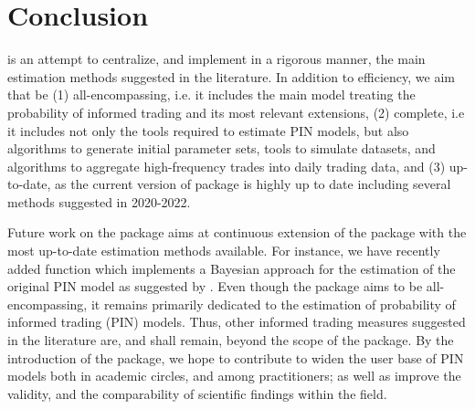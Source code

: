 \section{Conclusion}

 is an attempt to centralize, and implement in a rigorous manner, the main estimation methods suggested in the literature.  In addition to efficiency, we aim that  be (1) all-encompassing, i.e. it includes the main model treating the probability of informed trading and its most relevant extensions, (2) complete, i.e it includes not only the tools required to estimate PIN models, but also algorithms to generate initial parameter sets, tools to simulate datasets, and algorithms to aggregate high-frequency trades into daily trading data, and (3) up-to-date, as the current version of  package is highly up to date including several methods suggested in 2020-2022. 

Future work on the package aims at continuous extension of the package with the most up-to-date estimation methods available. For instance, we have recently added function  which implements a Bayesian approach for the estimation of the original PIN model as suggested by \cite{griffin2021}. Even though the  package aims to be all-encompassing, it remains primarily dedicated to the estimation of probability of informed trading (PIN) models. Thus, other informed trading measures suggested in the literature are, and shall remain, beyond the scope of the package. By the introduction of the package, we hope to contribute to widen the user base of PIN models both in academic circles, and among practitioners; as well as improve the validity, and the comparability of scientific findings within the field.

